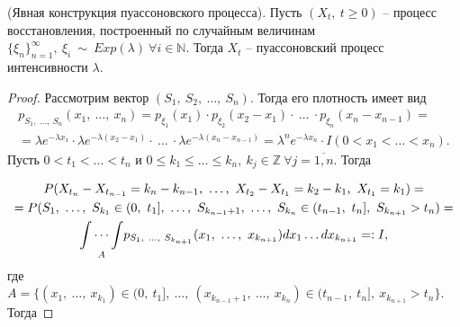 \begin{theorem}
(Явная конструкция пуассоновского процесса). Пусть $\displaystyle ( X_{t} ,\ t\geqslant 0)$ -- процесс восстановления, построенный по случайным величинам $\displaystyle \{\xi _{n}\}_{n=1}^{\infty } ,\ \xi _{i} \ \sim \ Exp( \lambda ) \ \forall i\in \mathbb{N}$. Тогда $\displaystyle X_{t}$ -- пуассоновский процесс интенсивности $\displaystyle \lambda $.
\end{theorem}
\begin{proof}
Рассмотрим вектор $\displaystyle ( S_{1} ,\ S_{2} ,\ \dotsc ,\ S_{n})$. Тогда его плотность имеет вид
\begin{gather*}
p_{S_{1} ,\ \dotsc ,\ S_{n}}( x_{1} ,\ \dotsc ,\ x_{n}) =p_{\xi _{1}}( x_{1}) \cdotp p_{\xi _{2}}( x_{2} -x_{1}) \cdotp \ \dotsc \ \cdotp p_{\xi _{n}}( x_{n} -x_{n-1}) =\\
=\lambda e^{-\lambda x_{1}} \cdotp \lambda e^{-\lambda ( x_{2} -x_{1})} \cdotp \ \dotsc \ \cdotp \lambda e^{-\lambda ( x_{n} -x_{n-1})} =\lambda ^{n} e^{-\lambda x_{n}} \cdotp I( 0< x_{1} < \dotsc < x_{n}) .
\end{gather*}
 Пусть $\displaystyle 0< t_{1} < \dotsc < t_{n}$ и $\displaystyle 0\leqslant k_{1} \leqslant \dotsc \leqslant k_{n} ,\ k_{j} \in \mathbb{Z} \ \forall j=\overline{1,n}$. Тогда

\begin{gather*}
P( X_{t_{n}} -X_{t_{n-1}} =k_{n} -k_{n-1} ,\ \dotsc ,\ X_{t_{2}} -X_{t_{1}} =k_{2} -k_{1} ,\ X_{t_{1}} =k_{1}) =\\
=P( S_{1} ,\ \dotsc ,\ S_{k_{1}} \in ( 0,\ t_{1}] ,\ \dotsc ,\ S_{k_{n-1} +1} ,\ \dotsc ,\ S_{k_{n}} \in ( t_{n-1} ,\ t_{n}] ,\ S_{k_{n+1}}  >t_{n}) =\\
\underset{A}{\idotsint} p_{S_{1} ,\ \dotsc ,\ S_{k_{n+1}}}( x_{1} ,\ \dotsc ,\ x_{k_{n+1}}) dx_{1} \dotsc dx_{k_{n+1}} =:I,
\end{gather*}
где $\displaystyle A=\{( x_{1} ,\ \dotsc ,\ x_{k_{1}}) \in ( 0,\ t_{1}] ,\ \dotsc ,\ ( x_{k_{n-1} +1} ,\ \dotsc ,\ x_{k_{n}}) \in ( t_{n-1} ,\ t_{n}] ,\ x_{k_{n+1}}  >t_{n}\}$. Тогда


\end{proof}
